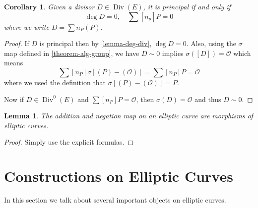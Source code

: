 \documentclass[12pt]{article}
\newtheorem{lemma}{Lemma}[subsection]
\newtheorem{corollary}{Corollary}[subsection]
\theoremstyle{remark}
\theoremstyle{definition}
\newcommand{\s}[0]{\sigma}
\newcommand{\ecO}[0]{\mathcal O}
\newcommand{\Div}[0]{\operatorname{Div}}
\begin{document}
            \begin{corollary}\label{corollary-principal-criterion}
                Given a divisor $D\in\Div(E)$, it is principal if and only if
                \[\deg D=0,\quad \sum [n_p]P=0\]
                where we write $D=\sum n_P(P)$.
            \end{corollary}
            \begin{proof}
                If $D$ is principal then by \autoref{lemma-deg-div}, $\deg D=0$. Also, using the $\s$ map defined in \autoref{theorem-alg-group}, we have $D\sim 0$ implies $\s([D])=\ecO$ which means
                \[\sum[n_P]\s[(P)-(\ecO)]=\sum [n_P]P=\ecO\]
                where we used the definition that $\s[(P)-(\ecO)]=P$.
                
                Now if $D\in\Div^0(E)$ and $\sum [n_P]P=\ecO$, then $\s(D)=\ecO$ and thus $D\sim 0$.
            \end{proof}
            \begin{lemma}\label{lemma-add-morph}
                The addition and negation map on an elliptic curve are morphisms of elliptic curves.
            \end{lemma}
            \begin{proof}
                Simply use the explicit formulas.
            \end{proof}
        
        \section{Constructions on Elliptic Curves}
            In this section we talk about several important objects on elliptic curves.
    
\end{document}
